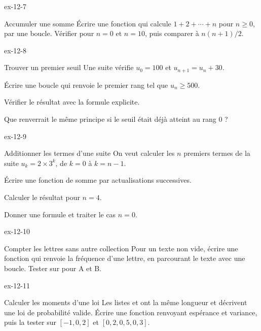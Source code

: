 \begin{blocLivre}{ex-12-7}
\begin{exercice}[2]{Accumuler une somme}
Écrire une fonction  qui calcule $1+2+\cdots+n$ pour $n\geq0$, par une boucle. Vérifier pour $n=0$ et $n=10$, puis comparer à $n(n+1)/2$.
\end{exercice}
\end{blocLivre}
\begin{blocLivre}{ex-12-8}
\begin{exercice}[2]{Trouver un premier seuil}
Une suite vérifie $u_0=100$ et $u_{n+1}=u_n+30$.\begin{questions}
\item Écrire une boucle qui renvoie le premier rang tel que $u_n\geq500$.
\item Vérifier le résultat avec la formule explicite.
\item Que renverrait le même principe si le seuil était déjà atteint au rang 0 ?
\end{questions}
\end{exercice}
\end{blocLivre}
\begin{blocLivre}{ex-12-9}
\begin{exercice}[2]{Additionner les termes d'une suite}
On veut calculer les $n$ premiers termes de la suite $u_k=2\times3^k$, de $k=0$ à $k=n-1$.\begin{questions}
\item Écrire une fonction de somme par actualisations successives.
\item Calculer le résultat pour $n=4$.
\item Donner une formule et traiter le cas $n=0$.
\end{questions}
\end{exercice}
\end{blocLivre}
\begin{blocLivre}{ex-12-10}
\begin{exercice}[2]{Compter les lettres sans autre collection}
Pour un texte non vide, écrire une fonction qui renvoie la fréquence d’une lettre, en parcourant le texte avec une boucle. Tester sur  pour A et B.
\end{exercice}
\end{blocLivre}
\begin{blocLivre}{ex-12-11}
\begin{exercice}[2]{Calculer les moments d'une loi}
Les listes  et  ont la même longueur et décrivent une loi de probabilité valide. Écrire une fonction renvoyant espérance et variance, puis la tester sur $[-1,0,2]$ et $[0{,}2,0{,}5,0{,}3]$.
\end{exercice}
\end{blocLivre}
